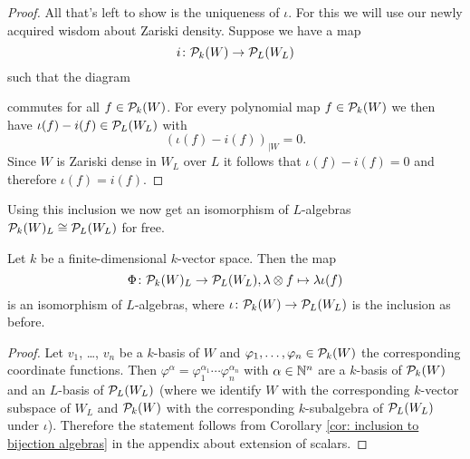 \begin{proof}
 All that’s left to show is the uniqueness of $\iota$. For this we will use our newly acquired wisdom about Zariski density. Suppose we have a map
 \[
  i \colon \mathcal{P}_k(W) \to \mathcal{P}_L(W_L)
 \]
 such that the diagram
  \begin{center}
 \end{center}
 commutes for all $f \in \mathcal{P}_k(W)$. For every polynomial map $f \in \mathcal{P}_k(W)$ we then have \mbox{$\iota(f)-i(f) \in \mathcal{P}_L(W_L)$} with
 \[
  \left( \iota(f)-i(f) \right)_{|W} = 0.
 \]
 Since $W$ is Zariski dense in $W_L$ over $L$ it follows that $\iota(f) - i(f) = 0$ and therefore $\iota(f) = i(f)$.
\end{proof}


Using this inclusion we now get an isomorphism of $L$-algebras $\mathcal{P}_k(W)_L \cong \mathcal{P}_L(W_L)$ for free.


\begin{prop}
 Let $k$ be a finite-dimensional $k$-vector space. Then the map
 \[
  \Phi \colon \mathcal{P}_k(W)_L \to \mathcal{P}_L(W_L), \lambda \otimes f \mapsto \lambda \iota(f)
 \]
 is an isomorphism of $L$-algebras, where $\iota \colon \mathcal{P}_k(W) \to \mathcal{P}_L(W_L)$ is the inclusion as before.
\end{prop}
\begin{proof}
 Let $v_1$, \dots, $v_n$ be a $k$-basis of $W$ and $\varphi_1, \dotsc, \varphi_n \in \mathcal{P}_k(W)$ the corresponding coordinate functions. Then $\varphi^\alpha = \varphi_1^{\alpha_1} \dotsm \varphi_n^{\alpha_n}$ with $\alpha \in \mathbb{N}^n$ are a $k$-basis of $\mathcal{P}_k(W)$ and an $L$-basis of $\mathcal{P}_L(W_L)$ (where we identify $W$ with the corresponding $k$-vector subspace of $W_L$ and $\mathcal{P}_k(W)$ with the corresponding $k$-subalgebra of $\mathcal{P}_L(W_L)$ under $\iota$). Therefore the statement follows from Corollary \ref{cor: inclusion to bijection algebras} in the appendix about extension of scalars.
\end{proof}


